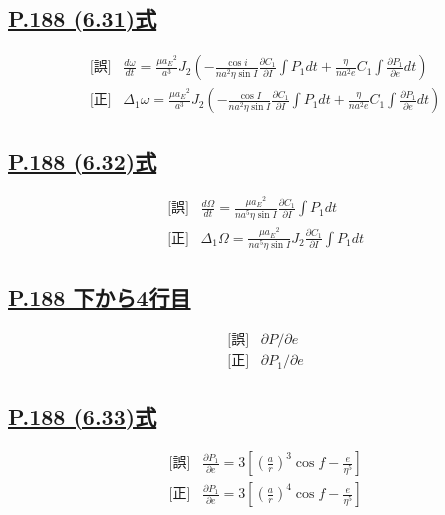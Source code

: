 \documentclass[9pt,fleqn]{bxjsarticle}
\begin{document}
\subsection*{\underline{P.188 (6.31)式}}
\begin{align*}
    &\text{[誤]} \hspace{10pt} \frac{d\omega}{dt} = \frac{\mu{a_E}^2}{a^3}J_2\left(-\frac{\cos{i}}{na^2\eta\sin{I}}\frac{\partial{C_1}}{\partial{I}}{\int}P_1dt + \frac{\eta}{na^2e}C_1\int\frac{\partial{P_1}}{\partial{e}}dt\right) \\
    &\text{[正]} \hspace{10pt} \varDelta_1\omega = \frac{\mu{a_E}^2}{a^3}J_2\left(-\frac{\cos{I}}{na^2\eta\sin{I}}\frac{\partial{C_1}}{\partial{I}}{\int}P_1dt + \frac{\eta}{na^2e}C_1\int\frac{\partial{P_1}}{\partial{e}}dt\right)
\end{align*}

\subsection*{\underline{P.188 (6.32)式}}
\begin{align*}
&\text{[誤]} \hspace{10pt} \frac{d\Omega}{dt} = \frac{\mu{a_E}^2}{na^5\eta\sin{I}}\frac{\partial{C_1}}{\partial{I}}{\int}P_1dt \\
&\text{[正]} \hspace{10pt} \varDelta_1\Omega = \frac{\mu{a_E}^2}{na^5\eta\sin{I}}J_2\frac{\partial{C_1}}{\partial{I}}{\int}P_1dt 
\end{align*}

\subsection*{\underline{P.188 下から4行目}}
\begin{align*}
    &\text{[誤]} \hspace{10pt} \partial{P}/\partial{e}\\
    &\text{[正]} \hspace{10pt} \partial{P_1}/\partial{e} 
\end{align*}

\subsection*{\underline{P.188 (6.33)式}}
\begin{align*}
    &\text{[誤]} \hspace{10pt} \frac{\partial{P_1}}{\partial{e}} = 3\left[\left(\frac{a}{r}\right)^3\cos{f}-\frac{e}{\eta^5}\right] \\
    &\text{[正]} \hspace{10pt} \frac{\partial{P_1}}{\partial{e}} = 3\left[\left(\frac{a}{r}\right)^4\cos{f}-\frac{e}{\eta^5}\right] 
\end{align*}
\end{document}
